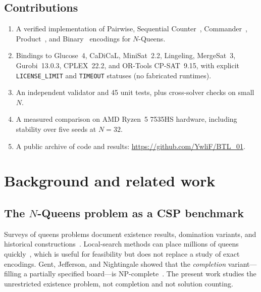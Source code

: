 \documentclass[a4paper,fleqn]{cas-sc}
\begin{document}
\subsection{Contributions}
\begin{enumerate}
    \item A verified implementation of Pairwise, Sequential Counter~\cite{sinz2005towards}, Commander~\cite{klieber2007commander}, Product~\cite{chen2010new}, and Binary~\cite{frisch2005symmetry} encodings for $N$-Queens.
    \item Bindings to Glucose~4, CaDiCaL, MiniSat~2.2, Lingeling, MergeSat~3, Gurobi~13.0.3, CPLEX~22.2, and OR-Tools CP-SAT~9.15, with explicit \texttt{LICENSE\_LIMIT} and \texttt{TIMEOUT} statuses (no fabricated runtimes).
    \item An independent validator and 45 unit tests, plus cross-solver checks on small $N$.
    \item A measured comparison on AMD Ryzen~5 7535HS hardware, including stability over five seeds at $N=32$.
    \item A public archive of code and results: \url{https://github.com/YwliF/BTL_01}.
\end{enumerate}

\section{Background and related work}
\label{sec:background}

\subsection{The $N$-Queens problem as a CSP benchmark}
Surveys of queens problems document existence results, domination variants, and historical constructions~\cite{bell2009survey}.
Local-search methods can place millions of queens quickly~\cite{sosic1994local}, which is useful for feasibility but does not replace a study of exact encodings.
Gent, Jefferson, and Nightingale showed that the \emph{completion} variant---filling a partially specified board---is NP-complete~\cite{gent2017nqueens}.
The present work studies the unrestricted existence problem, not completion and not solution counting.
\end{document}
